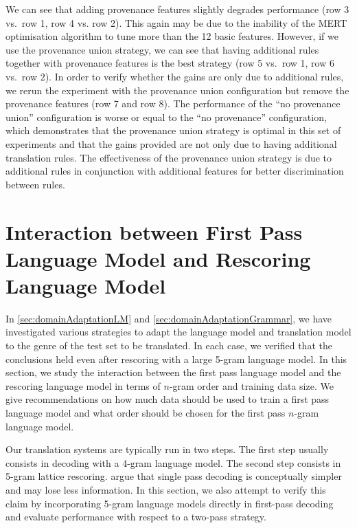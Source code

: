 %
We can see that adding provenance features slightly degrades
performance (row 3 vs.\ row 1, row 4 vs. row 2). This again
may be due to the inability of the MERT optimisation algorithm to
tune more than the 12 basic features.
However, if we use the provenance union strategy, we can see that having additional
rules together with provenance features is the best
strategy (row 5 vs.\ row 1, row 6 vs.\ row 2).
In order to verify whether the gains are only due to additional
rules, we rerun the experiment with the provenance union configuration but
remove the provenance
features (row 7 and row 8). The performance of the ``no provenance union''
configuration is worse or equal to the ``no provenance'' configuration, which
demonstrates that the provenance union strategy is optimal in this set of experiments
and that the gains provided are not only due to having additional translation
rules. The effectiveness of the provenance union strategy is due to
additional rules in conjunction with additional features for better discrimination
between rules.


\section{Interaction between First Pass Language Model and Rescoring Language Model}
\label{sec:bestPossibleRescoring}

In \autoref{sec:domainAdaptationLM} and \autoref{sec:domainAdaptationGrammar},
we have investigated various strategies to adapt the language model
and translation model to the genre of the test set to be translated.
In each case, we verified that the conclusions held even after
rescoring with a large 5-gram language model.
In this section, we study the interaction between the first pass language model
and the rescoring language model in terms of $n$-gram order and training
data size. We give recommendations on how much
data should be used to train a first pass language model
and what order should be chosen for the first pass
$n$-gram language model.

Our translation systems are typically run in two steps. The
first step usually consists in decoding with
a 4-gram language model. The second step consists
in 5-gram lattice rescoring.
\citet{brants-popat-xu-och-dean:2007:EMNLP-CoNLL} argue
that single pass decoding is conceptually simpler
and may lose less information.
In this section, we also attempt to verify this claim
by incorporating 5-gram language models directly in
first-pass decoding and evaluate performance with respect
to a two-pass strategy.

